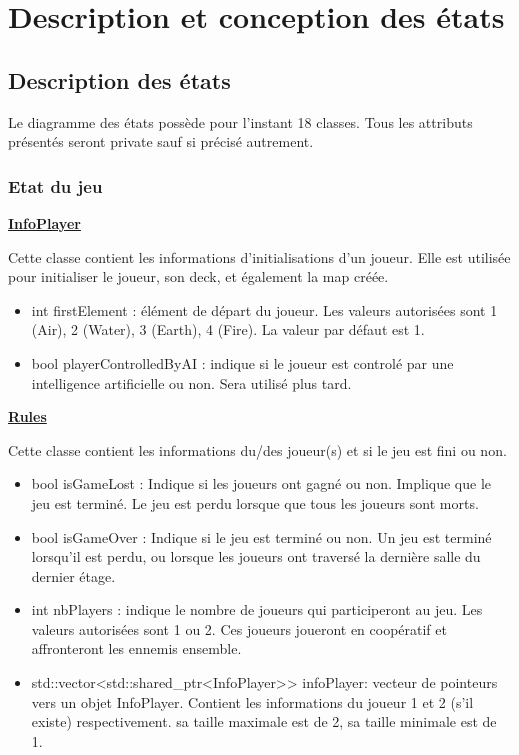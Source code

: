 \section{Description et conception des états}

\subsection{Description des états}

Le diagramme des états possède pour l'instant 18 classes. Tous les attributs présentés seront private sauf si précisé autrement.

\subsubsection{Etat du jeu}

\underline{\textbf{InfoPlayer}}
\par Cette classe contient les informations d'initialisations d'un joueur. Elle est utilisée pour initialiser le joueur, son deck, et également la map créée.

\begin{itemize}
        \item int firstElement : élément de départ du joueur. Les valeurs autorisées sont 1 (Air), 2 (Water), 3 (Earth), 4 (Fire). La valeur par défaut est 1.
        \item  bool playerControlledByAI : indique si le joueur est controlé par une intelligence artificielle ou non. Sera utilisé plus tard.
\end{itemize}

\underline{\textbf{Rules}}
\par Cette classe contient les informations du/des joueur(s) et si le jeu est fini ou non.
\begin{itemize}
    \item bool isGameLost : Indique si les joueurs ont gagné ou non. Implique que le jeu est terminé. Le jeu est perdu lorsque que tous les joueurs sont morts.
    \item bool isGameOver : Indique si le jeu est terminé ou non. Un jeu est terminé lorsqu'il est perdu, ou lorsque les joueurs ont traversé la dernière salle du dernier étage.
    \item int nbPlayers : indique le nombre de joueurs qui participeront au jeu. Les valeurs autorisées sont 1 ou 2. Ces joueurs joueront en coopératif et affronteront les ennemis ensemble.
    \item  std::vector<std::shared\_ptr<InfoPlayer>> infoPlayer: vecteur de pointeurs vers un objet InfoPlayer. Contient les informations du joueur 1 et 2 (s'il existe) respectivement. sa taille maximale est de 2, sa taille minimale est de 1.
\end{itemize}

